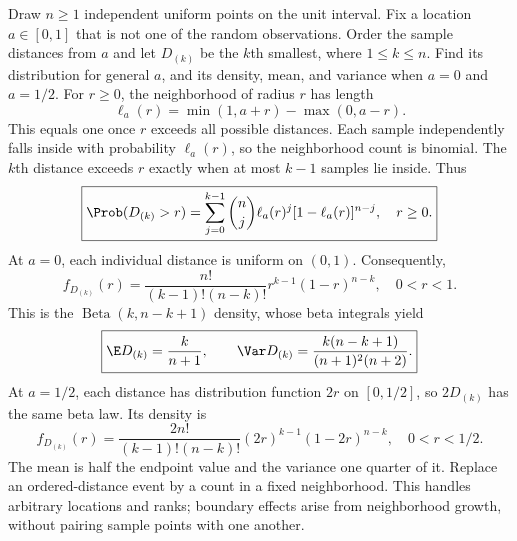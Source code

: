 Draw $n\ge1$ independent uniform points on the unit interval. Fix a location $a\in[0,1]$ that is not one of the random observations. Order the sample distances from $a$ and let $D_{(k)}$ be the $k$th smallest, where $1\le k\le n$. Find its distribution for general $a$, and its density, mean, and variance when $a=0$ and $a=1/2$.
\solution For $r\ge0$, the neighborhood of radius $r$ has length
\[
\ell_a(r)=\min(1,a+r)-\max(0,a-r).
\]
This equals one once $r$ exceeds all possible distances. Each sample independently falls inside with probability $\ell_a(r)$, so the neighborhood count is binomial. The $k$th distance exceeds $r$ exactly when at most $k-1$ samples lie inside. Thus
\[
\boxed{\Prob(D_{(k)}>r)=\sum_{j=0}^{k-1}\binom nj
\ell_a(r)^j[1-\ell_a(r)]^{n-j},\quad r\ge0.}
\]
At $a=0$, each individual distance is uniform on $(0,1)$. Consequently,
\[
f_{D_{(k)}}(r)=\frac{n!}{(k-1)!(n-k)!}r^{k-1}(1-r)^{n-k},\quad0<r<1.
\]
This is the $\operatorname{Beta}(k,n-k+1)$ density, whose beta integrals yield
\[
\boxed{\E D_{(k)}=\frac{k}{n+1},\qquad
\Var D_{(k)}=\frac{k(n-k+1)}{(n+1)^2(n+2)}.}
\]
At $a=1/2$, each distance has distribution function $2r$ on $[0,1/2]$, so $2D_{(k)}$ has the same beta law. Its density is
\[
f_{D_{(k)}}(r)=\frac{2n!}{(k-1)!(n-k)!}(2r)^{k-1}(1-2r)^{n-k},\quad0<r<1/2.
\]
The mean is half the endpoint value and the variance one quarter of it.
\insight Replace an ordered-distance event by a count in a fixed neighborhood. This handles arbitrary locations and ranks; boundary effects arise from neighborhood growth, without pairing sample points with one another.
